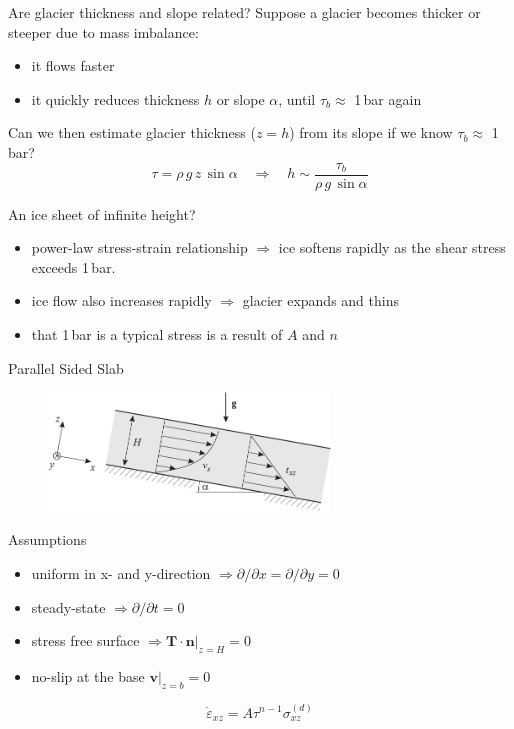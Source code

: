 \documentclass[hide notes,intlimits,unknownkeysallowed]{beamer}
\newcommand{\bn}{\mathbf{n}}
\newcommand{\bv}{\mathbf{v}}
\begin{document}
\begin{frame}{Are glacier thickness and slope related?}
  Suppose a glacier becomes thicker or steeper due to mass imbalance:
  \begin{itemize}
    \item it flows faster
    \item it quickly reduces thickness $h$ or slope $\alpha$, until $\tau_{b} \approx$ 1\,bar again
  \end{itemize}
  Can we then estimate glacier thickness ($z=h$) from its slope if we know $\tau_{b} \approx$ 1\,bar?
  \begin{displaymath}
    \tau = \rho\,g\,z\,\sin{\alpha} \quad \Rightarrow \quad h \sim \frac{\tau_{b}}{\rho\,g\,\sin{\alpha}}
  \end{displaymath}
\end{frame}


\begin{frame}{An ice sheet of infinite height?}
\begin{itemize}
  \item power-law stress-strain relationship $\Rightarrow$ ice softens
    rapidly as the shear stress exceeds 1\,bar.
  \item ice flow also increases rapidly $\Rightarrow$ glacier expands
    and thins
  \item that 1\,bar is a typical stress is a result of $A$ and $n$
\end{itemize}

\end{frame}


\begin{frame}{Parallel Sided Slab}
  \vspace{-1em}
  \begin{figure}
    \includegraphics[width=7.5cm]{fig_3_11}
  \end{figure}
  \vspace{-1em}
  \begin{block}{Assumptions}
    \begin{itemize}
    \item uniform in x- and y-direction $\Rightarrow \partial / \partial x = \partial / \partial y = 0$
    \item steady-state $\Rightarrow \partial / \partial t = 0$
    \item stress free surface $\Rightarrow \mathbf{T}\cdot \bn \vert_{z=H} = 0$
    \item no-slip at the base $\bv \vert_{z=b} = 0$
    \end{itemize}
  \end{block}
  \vspace{.5em}
  \begin{equation*}
    \dot \varepsilon_{xz} = A\tau^{n-1} \sigma_{xz}^{(d)}
  \end{equation*}
\end{frame}
\end{document}
